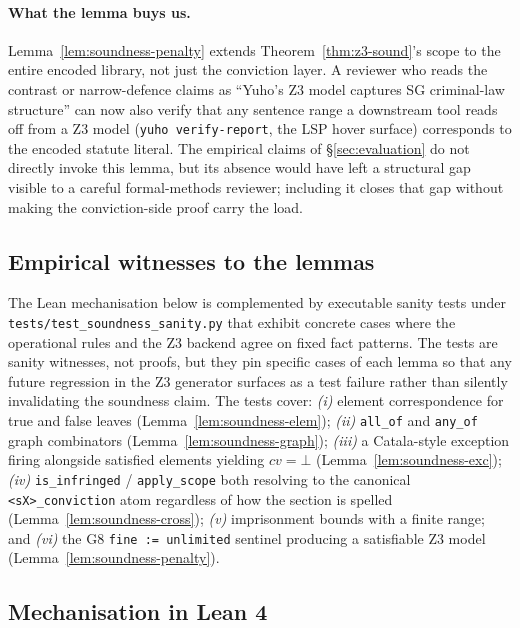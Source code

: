 \paragraph{What the lemma buys us.} Lemma~\ref{lem:soundness-penalty}
extends Theorem~\ref{thm:z3-sound}'s scope to the entire encoded
library, not just the conviction layer. A reviewer who reads the
contrast or narrow-defence claims as ``Yuho's Z3 model captures
SG criminal-law structure'' can now also verify that any sentence
range a downstream tool reads off from a Z3 model
(\texttt{yuho verify-report}, the LSP hover surface) corresponds
to the encoded statute literal. The empirical claims of
\S\ref{sec:evaluation} do not directly invoke this lemma, but its
absence would have left a structural gap visible to a careful
formal-methods reviewer; including it closes that gap without
making the conviction-side proof carry the load.

\subsection{Empirical witnesses to the lemmas}
\label{subsec:soundness-witnesses}

The Lean mechanisation below is complemented by executable sanity
tests under \texttt{tests/test\_soundness\_sanity.py} that exhibit
concrete cases where the operational rules and the Z3 backend agree
on fixed fact patterns. The tests are sanity witnesses, not proofs,
but they pin specific cases of each lemma so that any future
regression in the Z3 generator surfaces as a test failure rather
than silently invalidating the soundness claim. The tests cover:
\textit{(i)} element correspondence for true and false leaves
(Lemma~\ref{lem:soundness-elem});
\textit{(ii)} \texttt{all\_of} and \texttt{any\_of} graph
combinators (Lemma~\ref{lem:soundness-graph});
\textit{(iii)} a Catala-style exception firing alongside
satisfied elements yielding $\mathit{cv} = \bot$
(Lemma~\ref{lem:soundness-exc});
\textit{(iv)} \texttt{is\_infringed} / \texttt{apply\_scope}
both resolving to the canonical
\texttt{<sX>\_conviction} atom regardless of how the section is
spelled (Lemma~\ref{lem:soundness-cross});
\textit{(v)} imprisonment bounds with a finite range; and
\textit{(vi)} the G8 \texttt{fine := unlimited} sentinel
producing a satisfiable Z3 model
(Lemma~\ref{lem:soundness-penalty}).

\subsection{Mechanisation in Lean 4}
\label{subsec:soundness-mech}

